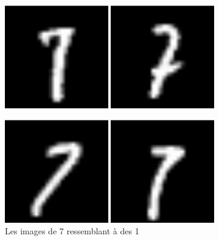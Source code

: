 \documentclass[oneside,13pt,a4paper]{report}
\begin{document}
\begin{figure}[h]
\begin{minipage}[c]{.46\linewidth}
\centering
\includegraphics[width=0.4\textwidth]{img/7_1.png}
\end{minipage}
\hfill%
\begin{minipage}[c]{.46\linewidth}
\centering
\includegraphics[width=0.4\textwidth]{img/7_2.png}
\end{minipage}
\end{figure}

\begin{figure}[h]
\begin{minipage}[c]{.46\linewidth}
\centering
\includegraphics[width=0.4\textwidth]{img/7_3.png}
\end{minipage}
\hfill%
\begin{minipage}[c]{.46\linewidth}
\centering
\includegraphics[width=0.4\textwidth]{img/7_4.png}
\end{minipage}
\caption{Les images de 7 ressemblant à des 1}
\label{71}
\end{figure}
\end{document}
